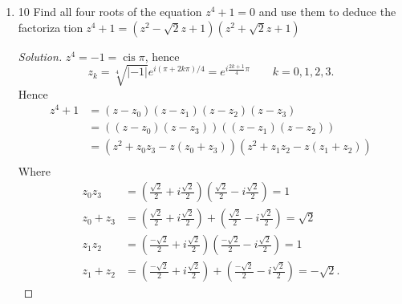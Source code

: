 \begin{enumerate}
\item 10 Find all four roots of the equation $z^4+1=0$ and use them to deduce the factoriza$\operatorname{tion} z^4+1=\left(z^2-\sqrt{2} z+1\right)\left(z^2+\sqrt{2} z+1\right)$
\begin{proof}[Solution]
	$z^4 = -1 = \operatorname{cis} \pi$, hence \[
		z_k = \sqrt[4]{|-1|} e^{i(\pi+2 k \pi) / 4} = e^{i\frac{2k+1}{4}\pi} \qquad k = 0,1,2,3
	.\] 
	Hence 
	\begin{align*}
		z^4 + 1 &= (z-z_0)(z-z_1)(z-z_2)(z-z_3)\\
		&= \left( (z-z_0)(z-z_3) \right) \left( (z-z_1)(z-z_2) \right)  \\
		&= \left( z^2 + z_0z_3-z(z_0+z_3) \right)\left( z^2 + z_1z_2-z(z_1+z_2) \right)  \\
	\end{align*}
	Where
	\begin{align*}
		z_0z_3&= \left( \frac{\sqrt{2} }{2}+i \frac{\sqrt{2} }{2} \right)\left( \frac{\sqrt{2} }{2}-i \frac{\sqrt{2} }{2} \right)  = 1 \\
		z_0+z_3&= \left( \frac{\sqrt{2} }{2}+i \frac{\sqrt{2} }{2} \right)+\left( \frac{\sqrt{2} }{2}-i \frac{\sqrt{2} }{2} \right)  = \sqrt{2}  \\
		z_1z_2&= \left( \frac{-\sqrt{2} }{2}+i \frac{\sqrt{2} }{2} \right)\left( \frac{-\sqrt{2} }{2}-i \frac{\sqrt{2} }{2} \right)  = 1 \\
		z_1+z_2&= \left( \frac{-\sqrt{2} }{2}+i \frac{\sqrt{2} }{2} \right)+\left( \frac{-\sqrt{2} }{2}-i \frac{\sqrt{2} }{2} \right)  = -\sqrt{2}
	.\end{align*}
\end{proof}



\end{enumerate}
